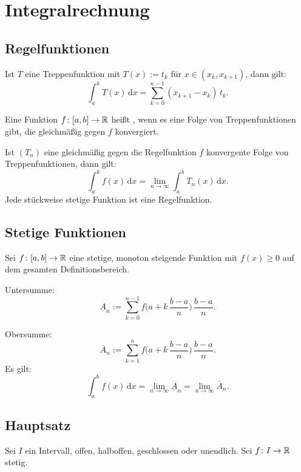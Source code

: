 \section{Integralrechnung}
\subsection{Regelfunktionen}
Ist $T$ eine Treppenfunktion
mit $T(x):=t_k$ für $x\in(x_k,x_{k+1})$,
dann gilt:
\begin{equation}
\int_a^b T(x)\,\mathrm dx = \sum_{k=0}^{n-1} (x_{k+1}-x_k)\,t_k.
\end{equation}
\begin{definition}[Regelfunktion]\mbox{}\newline
Eine Funktion $f\colon[a,b]\to\mathbb R$ heißt
, wenn es eine
Folge von Treppenfunktionen gibt, die gleichmäßig gegen $f$
konvergiert.
\end{definition}

\noindent
Ist $(T_n)$ eine gleichmäßig gegen die Regelfunktion $f$ konvergente
Folge von Treppenfunktionen, dann gilt:
\begin{equation}
\int_a^b f(x)\,\mathrm dx = \lim_{n\to\infty} \int_a^b T_n(x)\,\mathrm dx.
\end{equation}
Jede stückweise stetige Funktion ist eine Regelfunktion.

\subsection{Stetige Funktionen}
Sei $f\colon [a,b]\to\mathbb R$ eine stetige, monoton steigende
Funktion mit $f(x)\ge 0$ auf dem gesamten Definitionsbereich.

Untersumme:
\begin{equation}
\underline{A}_n := \sum_{k=0}^{n-1}
f\Big(a+k\,\frac{b-a}{n}\Big)\,\frac{b-a}{n}.
\end{equation}

Obersumme:
\begin{equation}
\overline{A}_n := \sum_{k=1}^{n}
f\Big(a+k\,\frac{b-a}{n}\Big)\,\frac{b-a}{n}.
\end{equation}
Es gilt:
\begin{equation}
\int_a^b f(x)\,\mathrm dx
= \lim_{n\to\infty}\underline A_n
= \lim_{n\to\infty}\overline A_n.
\end{equation}

\subsection{Hauptsatz}
Sei $I$ ein Intervall, offen, halboffen, geschlossen oder unendlich.
Sei $f\colon I\to\mathbb R$ stetig.


